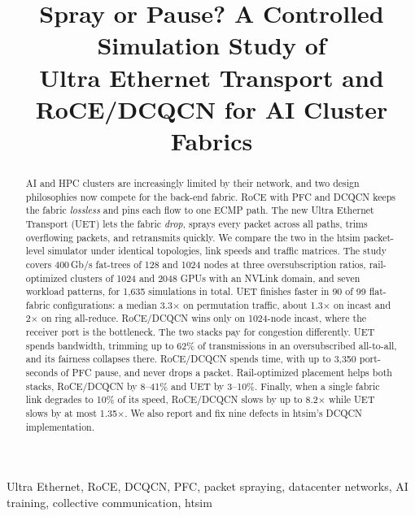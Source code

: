 \documentclass[conference]{IEEEtran}
\newcommand{\todo}[1]{\textcolor{red}{[TODO: #1]}}
\begin{document}
\title{Spray or Pause? A Controlled Simulation Study of\\
Ultra Ethernet Transport and RoCE/DCQCN for AI Cluster Fabrics}

\author{
\IEEEauthorblockA{\todo{affiliation}}}

\maketitle

\begin{abstract}
AI and HPC clusters are increasingly limited by their network, and two design
philosophies now compete for the back-end fabric. RoCE with PFC and DCQCN keeps
the fabric \emph{lossless} and pins each flow to one ECMP path. The new Ultra
Ethernet Transport (UET) lets the fabric \emph{drop}, sprays every packet across
all paths, trims overflowing packets, and retransmits quickly. We compare the two
in the htsim packet-level simulator under identical topologies, link speeds and
traffic matrices. The study covers 400\,Gb/s fat-trees of 128 and 1024 nodes at
three oversubscription ratios, rail-optimized clusters of 1024 and 2048 GPUs
with an NVLink domain, and seven workload patterns, for 1{,}635 simulations in
total. UET finishes faster in 90 of 99 flat-fabric configurations: a median
3.3$\times$ on permutation traffic, about 1.3$\times$ on incast and 2$\times$
on ring all-reduce. RoCE/DCQCN wins only on 1024-node incast, where the receiver
port is the bottleneck. The two stacks pay for congestion differently. UET
spends bandwidth, trimming up to 62\% of transmissions in an oversubscribed
all-to-all, and its fairness collapses there. RoCE/DCQCN spends time, with up to
3{,}350 port-seconds of PFC pause, and never drops a packet. Rail-optimized
placement helps both stacks, RoCE/DCQCN by 8--41\% and UET by 3--10\%. Finally,
when a single fabric link degrades to 10\% of its speed, RoCE/DCQCN slows by up
to 8.2$\times$ while UET slows by at most 1.35$\times$. We also report and fix
nine defects in htsim's DCQCN implementation.
\end{abstract}

\begin{IEEEkeywords}
Ultra Ethernet, RoCE, DCQCN, PFC, packet spraying, datacenter networks,
AI training, collective communication, htsim
\end{IEEEkeywords}

\end{document}
